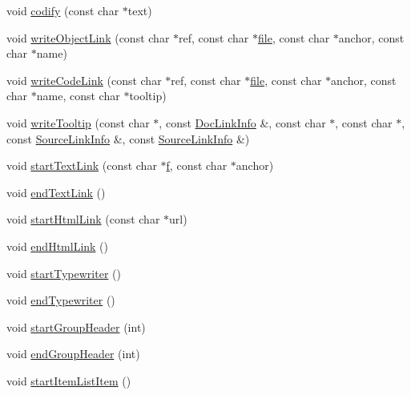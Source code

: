 \begin{DoxyCompactItemize}
\item 
void \hyperlink{class_r_t_f_generator_a331ca74e622c48bbbcad7e02139a6bfb}{codify} (const char $\ast$text)
\item 
void \hyperlink{class_r_t_f_generator_a5b27737ba89d55761a9908a088631367}{write\+Object\+Link} (const char $\ast$ref, const char $\ast$\hyperlink{class_output_generator_aed5ad11c3844cdf71ec6fee6c1c84286}{file}, const char $\ast$anchor, const char $\ast$name)
\item 
void \hyperlink{class_r_t_f_generator_ad598f8811fde4d3b1849c2e9b92a6686}{write\+Code\+Link} (const char $\ast$ref, const char $\ast$\hyperlink{class_output_generator_aed5ad11c3844cdf71ec6fee6c1c84286}{file}, const char $\ast$anchor, const char $\ast$name, const char $\ast$tooltip)
\item 
void \hyperlink{class_r_t_f_generator_a06e0455dd78d9d79ea51e6d31e6877fe}{write\+Tooltip} (const char $\ast$, const \hyperlink{struct_doc_link_info}{Doc\+Link\+Info} \&, const char $\ast$, const char $\ast$, const \hyperlink{struct_source_link_info}{Source\+Link\+Info} \&, const \hyperlink{struct_source_link_info}{Source\+Link\+Info} \&)
\item 
void \hyperlink{class_r_t_f_generator_aa92286bf94c590a675ac75f8f5c1671e}{start\+Text\+Link} (const char $\ast$\hyperlink{060__command__switch_8tcl_af6830d2c644b45088ea8f1f74a46b778}{f}, const char $\ast$anchor)
\item 
void \hyperlink{class_r_t_f_generator_a6e7091e1279e20ea431ddd36a6984e77}{end\+Text\+Link} ()
\item 
void \hyperlink{class_r_t_f_generator_a265ab601396745bb97d5c6cee59329d6}{start\+Html\+Link} (const char $\ast$url)
\item 
void \hyperlink{class_r_t_f_generator_a73a4ea59114077ea461ff16757c8429b}{end\+Html\+Link} ()
\item 
void \hyperlink{class_r_t_f_generator_ac3760aa18a5102cd8e8b0a4969f0953d}{start\+Typewriter} ()
\item 
void \hyperlink{class_r_t_f_generator_af9e17986de22ddd0b3a4afe4449b4a2c}{end\+Typewriter} ()
\item 
void \hyperlink{class_r_t_f_generator_a75318686aaf9a1d10be4fb9c7f90c98f}{start\+Group\+Header} (int)
\item 
void \hyperlink{class_r_t_f_generator_a50b5dd2478b90fdeef6df695f4f27bf9}{end\+Group\+Header} (int)
\item 
void \hyperlink{class_r_t_f_generator_ae09155b5cf6fb7457ae598f22d65d045}{start\+Item\+List\+Item} ()
\item 

\end{DoxyCompactItemize}
